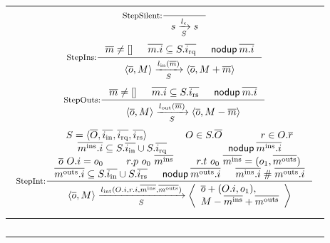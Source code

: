 \documentclass[sigplan,10pt,review,anonymous,screen]{acmart}\settopmatter{printfolios=true,printccs=false,printacmref=false}
\begin{document}
\begin{figure*}[t]
  \centering
  \begin{tabular}{|c|}
    \hline
    \begin{math}
      \begin{array}{c}
        \inference[StepSilent:]{}{\semstep{S}{s}{\lblEmpty{}}{s}} \\
        \mbox{}\vspace{-5pt} \\ %
        \inference[StepIns:]{\listof{m} \neq \listnil
          & \listof{\idxOf{m}} \subseteq \hsysRqA{S}
          & \nodup{\listof{\idxOf{m}}}}{\semstep{S}
          {\hst{\listof{o}}{M}}
          {\lblIns{\listof{m}}}
          {\hst{\listof{o}}{\enqMsgs{M}{\listof{m}}}}} \\
        \mbox{}\vspace{-5pt} \\ %
        \inference[StepOuts:]{\listof{m} \neq \listnil
          & \listof{\idxOf{m}} \subseteq \hsysRsA{S}
          & \nodup{\listof{\idxOf{m}}}}{\semstep{S}
          {\hst{\listof{o}}{M}}
          {\lblOuts{\listof{m}}}
          {\hst{\listof{o}}{\deqMsgs{M}{\listof{m}}}}} \\
        \mbox{}\vspace{-5pt} \\ %
        \inference[StepInt:]{S = \hsyss{\listof{O}}{i}
          & O \in S.\listof{O}
          & r \in O.\listof{r} \\
          \midxIns{m} \subseteq \hsysInA{S} \cup \hsysRqA{S}
          & \nodup{\midxIns{m}} \\
          \listof{o}\ \idxOf{O} = o_0
          & r.p\ o_0\ \msgIns{m}
          & r.t\ o_0\ \msgIns{m} = (o_1, \msgOuts{m}) \\
          \midxOuts{m} \subseteq \hsysInA{S} \cup \hsysRsA{S}
          & \nodup{\midxOuts{m}}
          & \disj{\midxIns{m}}{\midxOuts{m}}}{\semstep{S}
          {\hst{\listof{o}}{M}}
          {\lblInt{\idxOf{O}}{\idxOf{r}}{\msgIns{m}}{\msgOuts{m}}}
          {\hstm{\mapupd{\listof{o}}{\idxOf{O}}{o_1}}{\enqMsgs{\deqMsgs{M}{\msgIns{m}}}{\msgOuts{m}}}}} \\
        \mbox{}\vspace{-5pt} \\ %
      \end{array}
    \end{math}\\
    \hline
    \begin{math}
      \begin{array}{ccc}

\end{array}
\end{math}
\end{tabular}
\end{figure*}
\end{document}
